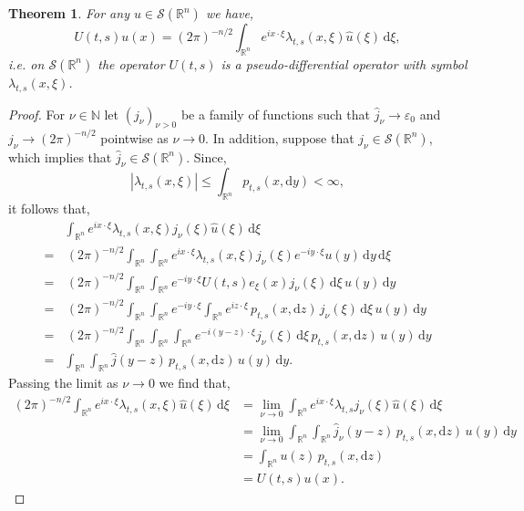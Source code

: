 \documentclass[a4paper, 12pt]{report}
\newtheorem{theorem}{Theorem}[section]
\theoremstyle{cor}
\theoremstyle{remark}
\theoremstyle{definition}
\begin{document}
\begin{theorem}
For any $u \in \mathcal{S}(\mathbb{R}^n)$ we have,
\begin{equation}
U(t, s)u(x) = (2\pi)^{-n/2}\int_{\mathbb{R}^n}e^{ix\cdot\xi}\lambda_{t, s}(x, \xi)\hat{u}(\xi)\,\mathrm{d}\xi,
\end{equation}
i.e. on $\mathcal{S}(\mathbb{R}^n)$ the operator $U(t, s)$ is a pseudo-differential operator with symbol $\lambda_{t, s}(x, \xi)$.
\end{theorem}
\begin{proof}
For $\nu \in \mathbb{N}$ let $(j_\nu)_{\nu > 0}$ be a family of functions such that $\hat{j}_\nu \to \varepsilon_0$ and $j_\nu \to (2\pi)^{-n/2}$ pointwise as $\nu \to 0$.  In addition, suppose that $j_\nu \in \mathcal{S}(\mathbb{R}^n)$, which implies that $\hat{j}_\nu \in \mathcal{S}(\mathbb{R}^n)$.  Since,
$$
|\lambda_{t, s}(x, \xi)| \le \int_{\mathbb{R}^n}p_{t, s}(x, \mathrm{d}y) < \infty,
$$
it follows that,
$$
\begin{aligned}
& \int_{\mathbb{R}^n}e^{ix\cdot\xi}\lambda_{t, s}(x, \xi)j_\nu(\xi)\hat{u}(\xi)\,\mathrm{d}\xi\\
= & \, (2\pi)^{-n/2}\int_{\mathbb{R}^n}\int_{\mathbb{R}^n}e^{ix\cdot\xi}\lambda_{t, s}(x, \xi)j_\nu(\xi)e^{-iy\cdot\xi}u(y)\,\mathrm{d}y\,\mathrm{d}\xi\\
= & \, (2\pi)^{-n/2}\int_{\mathbb{R}^n}\int_{\mathbb{R}^n}e^{-iy\cdot\xi}U(t, s)e_\xi(x)j_\nu(\xi)\,\mathrm{d}\xi\,u(y)\,\mathrm{d}y\\
= & \, (2\pi)^{-n/2}\int_{\mathbb{R}^n}\int_{\mathbb{R}^n}e^{-iy\cdot\xi}\int_{\mathbb{R}^n}e^{iz\cdot\xi}\,p_{t, s}(x, \mathrm{d}z)\,j_\nu(\xi)\,\mathrm{d}\xi\,u(y)\,\mathrm{d}y\\
= & \, (2\pi)^{-n/2}\int_{\mathbb{R}^n}\int_{\mathbb{R}^n}\int_{\mathbb{R}^n}e^{-i(y - z)\cdot\xi}j_\nu(\xi)\,\mathrm{d}\xi\,p_{t, s}(x, \mathrm{d}z)\,u(y)\,\mathrm{d}y\\
= & \int_{\mathbb{R}^n}\int_{\mathbb{R}^n}\hat{j}(y - z)\,p_{t, s}(x, \mathrm{d}z)\,u(y)\,\mathrm{d}y.
\end{aligned}
$$
Passing the limit as $\nu \to 0$ we find that,
$$
\begin{aligned}
(2\pi)^{-n/2}\int_{\mathbb{R}^n}e^{ix\cdot\xi}\lambda_{t, s}(x, \xi)\hat{u}(\xi)\,\mathrm{d}\xi & = \lim_{\nu \to 0}\int_{\mathbb{R}^n}e^{ix\cdot\xi}\lambda_{t, s}j_\nu(\xi)\hat{u}(\xi)\,\mathrm{d}\xi\\
& = \lim_{\nu \to 0}\int_{\mathbb{R}^n}\int_{\mathbb{R}^n}\hat{j}_\nu(y - z)\,p_{t, s}(x, \mathrm{d}z)\,u(y)\,\mathrm{d}y\\
& = \int_{\mathbb{R}^n}u(z)\,p_{t, s}(x, \mathrm{d}z)\\
& = U(t, s)u(x).
\end{aligned}
$$
\end{proof}
\end{document}

